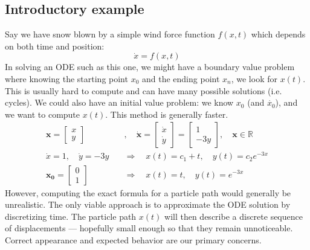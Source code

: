\documentclass{article}
\begin{document}
\subsection{Introductory example}
Say we have snow blown by a simple wind force function $f(x, t)$ which depends on both time and position:
\[\dot{x} = f(x, t)\]
In solving an ODE such as this one, we might have a boundary value problem where knowing the starting point $x_0$ and the ending point $x_n$, we look for $x(t)$. This is usually hard to compute and can have many possible solutions (i.e. cycles). We could also have an initial value problem: we know $x_0$ (and $\dot{x_0}$), and we want to compute $x(t)$. This method is generally faster.
\begin{align*}
    \mathbf{x} = \begin{bmatrix} x \\ y \end{bmatrix}&, \quad
    \mathbf{\dot{x}} = \begin{bmatrix} \dot{x} \\ \dot{y} \end{bmatrix} = \begin{bmatrix} 1 \\ -3y \end{bmatrix}, \quad
    \mathbf{x} \in \mathbb{R} \\
    \dot{x} = 1,\quad \dot{y} = -3y \quad &\Rightarrow \quad x(t) = c_1+t, \quad y(t) = c_2 e^{-3 x} \\
    \mathbf{x_0} = \begin{bmatrix} 0 \\ 1 \end{bmatrix} \quad &\Rightarrow \quad 
    x(t) = t, \quad y(t) = e^{-3 x}
\end{align*}
However, computing the exact formula for a particle path would generally be unrealistic. The only viable approach is to approximate the ODE solution by discretizing time. The particle path $x(t)$ will then describe a discrete sequence of displacements --- hopefully small enough so that they remain unnoticeable. Correct appearance and expected behavior are our primary concerns.
\end{document}
